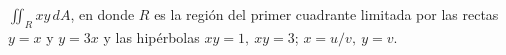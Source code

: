 \item $\iint_R xy \, dA$, en donde $R$ es la región del primer cuadrante limitada por las rectas $y = x$ y $y = 3x$ y las hipérbolas $xy = 1, \ xy = 3$; $x = u/v, \ y = v$.
